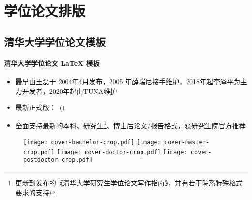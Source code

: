 
\section{学位论文排版}
\subsection{\ThuThesis 清华大学学位论文模板}

\begin{frame}{\ThuThesis}
  \framesubtitle{清华大学学位论文 \LaTeX{} 模板}
  \begin{itemize}
  \item 最早由王磊于 2004年4月发布，2005 年薛瑞尼接手维护，2018年起李泽平为主力开发者，2020年起由TUNA维护
  \item 最新正式版：\ThuThesisVersion\ (\ThuThesisDate)
  \item 全面支持最新的本科、研究生\footnote{更新到\ThuThesisGuideVersion{}发布的《清华大学研究生学位论文写作指南》，并有若干院系特殊格式要求的支持}、博士后论文/报告格式，获研究生院官方推荐 
  \end{itemize}
  \begin{figure}[htbp]
    \centering
    \texttt{[image: cover-bachelor-crop.pdf]}\hfill
    \texttt{[image: cover-master-crop.pdf]}\hfill
    \texttt{[image: cover-doctor-crop.pdf]}\hfill
    \texttt{[image: cover-postdoctor-crop.pdf]}
  \end{figure}
\end{frame}

